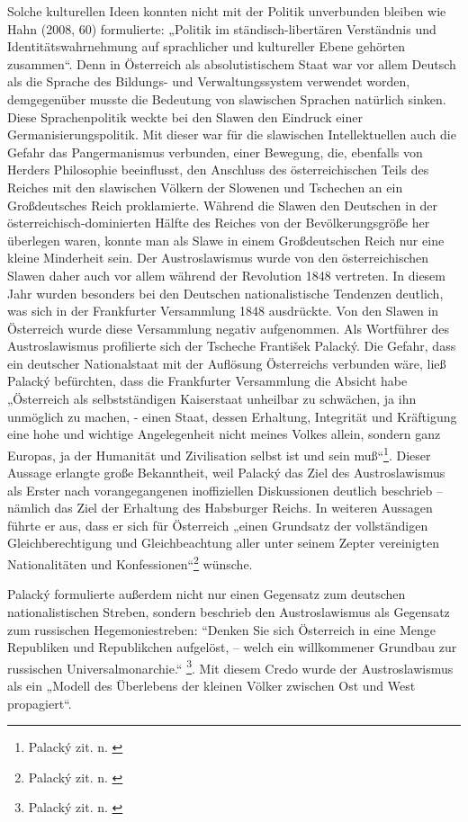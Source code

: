 \documentclass{../../sem_paper}
\begin{document}
Solche kulturellen Ideen konnten nicht mit der Politik unverbunden bleiben wie Hahn (2008,
60) formulierte: „Politik im ständisch-libertären Verständnis und Identitätswahrnehmung auf
sprachlicher und kultureller Ebene gehörten zusammen“. Denn in Österreich als
absolutistischem Staat war vor allem Deutsch als die Sprache des Bildungs- und
Verwaltungssystem verwendet worden, demgegenüber musste die Bedeutung von slawischen
Sprachen natürlich sinken. Diese Sprachenpolitik weckte bei den Slawen den Eindruck einer
Germanisierungspolitik. Mit dieser war für die slawischen Intellektuellen auch die Gefahr das
Pangermanismus verbunden, einer Bewegung, die, ebenfalls von Herders Philosophie
beeinflusst, den Anschluss des österreichischen Teils des Reiches mit den slawischen Völkern
der Slowenen und Tschechen an ein Großdeutsches Reich proklamierte. Während die Slawen
den
Deutschen
in
der
österreichisch-dominierten
Hälfte
des
Reiches
von
der
Bevölkerungsgröße her überlegen waren, konnte man als Slawe in einem Großdeutschen
Reich nur eine kleine Minderheit sein. Der Austroslawismus wurde von den österreichischen
Slawen daher auch vor allem während der Revolution 1848 vertreten. In diesem Jahr wurden
besonders bei den Deutschen nationalistische Tendenzen deutlich, was sich in der Frankfurter
Versammlung 1848 ausdrückte. Von den Slawen in Österreich wurde diese Versammlung
negativ aufgenommen. Als Wortführer des Austroslawismus profilierte sich der Tscheche
František Palacký. Die Gefahr, dass ein deutscher Nationalstaat mit der Auflösung Österreichs
verbunden wäre, ließ Palacký befürchten, dass die Frankfurter Versammlung die Absicht habe
„Österreich als selbstständigen Kaiserstaat unheilbar zu schwächen, ja ihn unmöglich zu
machen, - einen Staat, dessen Erhaltung, Integrität und Kräftigung eine hohe und wichtige
Angelegenheit nicht meines Volkes allein, sondern ganz Europas, ja der Humanität und
Zivilisation selbst ist und sein muß“\footnote{Palacký zit. n. \autocite[19]{moritsch1996}}. Dieser Aussage
erlangte große Bekanntheit, weil Palacký das Ziel des Austroslawismus als Erster nach
vorangegangenen inoffiziellen Diskussionen deutlich beschrieb – nämlich das Ziel der
Erhaltung des Habsburger Reichs. In weiteren Aussagen führte er aus, dass er sich für Österreich „einen
Grundsatz der vollständigen Gleichberechtigung und Gleichbeachtung aller unter seinem
Zepter vereinigten Nationalitäten und Konfessionen“\footnote{Palacký zit. n. \autocite[19]{moritsch1996}} wünsche.

Palacký formulierte außerdem nicht nur einen Gegensatz zum deutschen nationalistischen
Streben,
sondern beschrieb
den Austroslawismus
als
Gegensatz
zum
russischen
Hegemoniestreben: “Denken Sie sich Österreich in eine Menge Republiken und Republikchen
aufgelöst, -- welch ein willkommener Grundbau zur russischen Universalmonarchie.“
\footnote{Palacký zit. n. \autocite[19]{moritsch1996}}. Mit diesem Credo wurde der Austroslawismus als ein „Modell des Überlebens der kleinen
Völker zwischen Ost und West propagiert“\autocite[IIX]{busek}.
\end{document}
